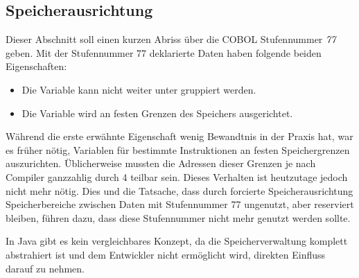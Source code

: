 \subsection{Speicherausrichtung}
Dieser Abschnitt soll einen kurzen Abriss über die COBOL Stufennummer \textit{77} geben. Mit der Stufennummer 77 deklarierte Daten haben folgende beiden Eigenschaften:

\begin{itemize}
    \item Die Variable kann nicht weiter unter gruppiert werden.
    \item Die Variable wird an festen Grenzen des Speichers ausgerichtet.
\end{itemize}

Während die erste erwähnte Eigenschaft wenig Bewandtnis in der Praxis hat, war es früher nötig, Variablen für bestimmte Instruktionen an festen Speichergrenzen auszurichten. Üblicherweise mussten die Adressen dieser Grenzen je nach Compiler ganzzahlig durch 4  teilbar sein. Dieses Verhalten ist heutzutage jedoch nicht mehr nötig. Dies und die Tatsache, dass durch forcierte Speicherausrichtung Speicherbereiche zwischen Daten mit Stufennummer 77 ungenutzt, aber reserviert bleiben, führen dazu, dass diese Stufennummer nicht mehr genutzt werden sollte.

In Java gibt es kein vergleichbares Konzept, da die Speicherverwaltung komplett abstrahiert ist und dem Entwickler nicht ermöglicht wird, direkten Einfluss darauf zu nehmen.